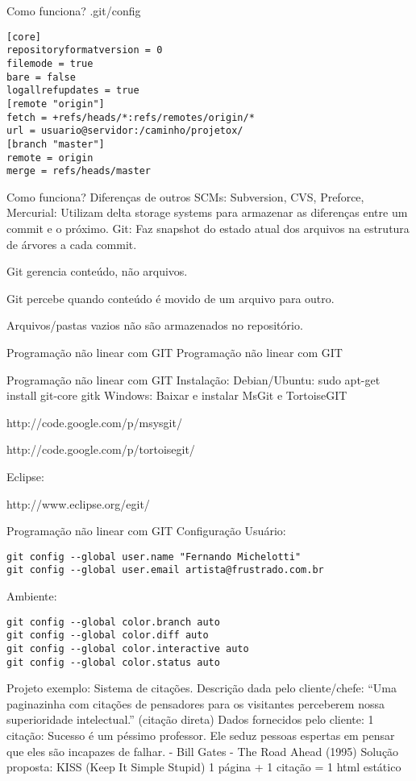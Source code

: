 \documentclass{beamer}
\begin{document}
Como funciona?
.git/config
\begin{verbatim}
[core]
repositoryformatversion = 0
filemode = true
bare = false
logallrefupdates = true
[remote "origin"]
fetch = +refs/heads/*:refs/remotes/origin/*
url = usuario@servidor:/caminho/projetox/
[branch "master"]
remote = origin
merge = refs/heads/master
\end{verbatim}

Como funciona?
Diferenças de outros SCMs:
Subversion, CVS, Preforce, Mercurial: Utilizam delta storage
systems para armazenar as diferenças entre um commit e o
próximo.
Git: Faz snapshot do estado atual dos arquivos na estrutura de
árvores a cada commit.

Git gerencia conteúdo, não arquivos.

Git percebe quando conteúdo é movido de um arquivo para outro.

Arquivos/pastas vazios não são armazenados no repositório.

Programação não linear com GIT
Programação não linear com GIT

Programação não linear com GIT
Instalação:
Debian/Ubuntu:
sudo apt-get install git-core gitk
Windows:
Baixar e instalar MsGit e TortoiseGIT

http://code.google.com/p/msysgit/


http://code.google.com/p/tortoisegit/

Eclipse:

http://www.eclipse.org/egit/

Programação não linear com GIT
Configuração
Usuário:
\begin{verbatim}
git config --global user.name "Fernando Michelotti"
git config --global user.email artista@frustrado.com.br
\end{verbatim}
Ambiente:
\begin{verbatim}
git config --global color.branch auto
git config --global color.diff auto
git config --global color.interactive auto
git config --global color.status auto
\end{verbatim}

Projeto exemplo:
Sistema de citações.
Descrição dada pelo cliente/chefe:
“Uma paginazinha com citações de pensadores para os visitantes perceberem
nossa superioridade intelectual.” (citação direta)
Dados fornecidos pelo cliente:
1 citação:
Sucesso é um péssimo professor. Ele seduz pessoas espertas em pensar que
eles são incapazes de falhar. - Bill Gates - The Road Ahead (1995)
Solução proposta:
KISS (Keep It Simple Stupid)
1 página + 1 citação = 1 html estático
\end{document}
